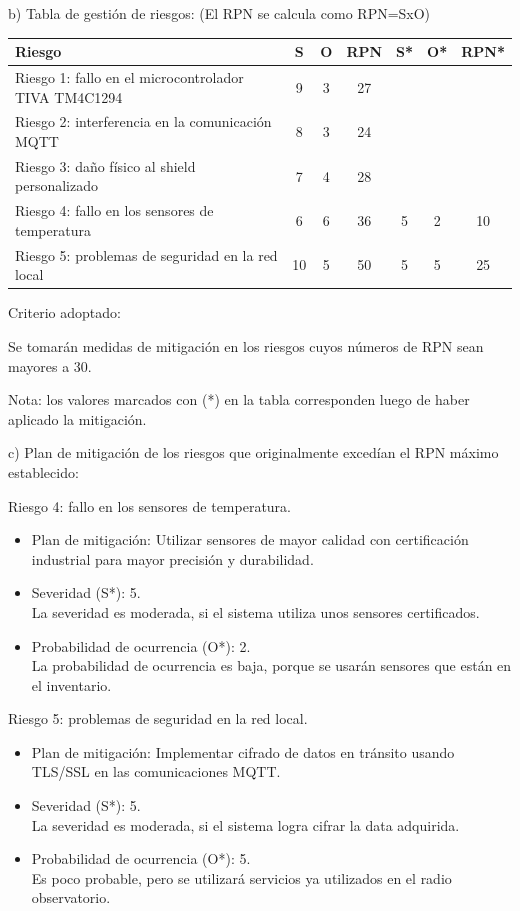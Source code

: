 \documentclass[
11pt, %
]{charter}
\begin{document}
b) Tabla de gestión de riesgos: (El RPN se calcula como RPN=SxO)

\begin{table}[htpb]
\centering
\begin{tabularx}{\linewidth}{@{}|X|c|c|c|c|c|c|@{}}
\hline
\rowcolor[HTML]{C0C0C0} 
Riesgo & S & O & RPN & S* & O* & RPN* \\ \hline
     Riesgo 1: fallo en el microcontrolador TIVA TM4C1294 & 9 & 3 &  27 &    &    &      \\ \hline
     Riesgo 2: interferencia en la comunicación MQTT & 8 & 3 &  24 &    &    &      \\ \hline
     Riesgo 3: daño físico al shield personalizado & 7 & 4 &  28 &    &    &      \\ \hline
     Riesgo 4: fallo en los sensores de temperatura & 6 & 6 &  36 & 5  & 2  & 10   \\ \hline
     Riesgo 5: problemas de seguridad en la red local & 10 & 5 & 50 & 5  & 5  & 25   \\ \hline
\end{tabularx}%
\end{table}

Criterio adoptado: 

Se tomarán medidas de mitigación en los riesgos cuyos números de RPN sean mayores a 30.

Nota: los valores marcados con (*) en la tabla corresponden luego de haber aplicado la mitigación.

c) Plan de mitigación de los riesgos que originalmente excedían el RPN máximo establecido:
 
Riesgo 4: fallo en los sensores de temperatura.
  \begin{itemize}
  	\item Plan de mitigación: Utilizar sensores de mayor calidad con certificación industrial para mayor precisión y durabilidad.
	\item Severidad (S*): 5. \\ 
	La severidad es moderada, si el sistema utiliza unos sensores certificados.
	\item Probabilidad de ocurrencia (O*): 2. \\
	La probabilidad de ocurrencia es baja, porque se usarán sensores que están en el inventario.
	\end{itemize}
\newpage
Riesgo 5: problemas de seguridad en la red local.
\begin{itemize}
	\item Plan de mitigación: Implementar cifrado de datos en tránsito usando TLS/SSL en las comunicaciones MQTT.
	\item Severidad (S*): 5. \\ 
	La severidad es moderada, si el sistema logra cifrar la data adquirida.
	\item Probabilidad de ocurrencia (O*): 5. \\
	Es poco probable, pero se utilizará servicios ya utilizados en el radio observatorio.
\end{itemize}   
\end{document}
